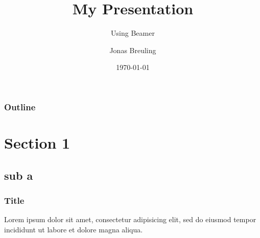 \documentclass{beamer}
\title{My Presentation}
\subtitle{Using Beamer}
\author{Jonas Breuling}
\institute{}
\date{\today}
\begin{document}
	\begin{frame}
		\titlepage
	\end{frame}
	
	\begin{frame}
		\frametitle{Outline}
		\tableofcontents
	\end{frame}
	
	\section{Section 1}
	\subsection{sub a}
	\begin{frame}
		\frametitle{Title}
		Lorem ipsum dolor sit amet, consectetur adipisicing elit, sed do eiusmod tempor incididunt ut labore et dolore magna aliqua.
	\end{frame}
\end{document}
